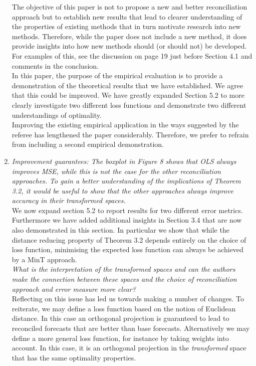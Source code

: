 \documentclass[a4paper,11pt]{article}
\begin{document}
\begin{enumerate}
		The objective of this paper is not to propose a new and better reconciliation approach but to establish new results that lead to clearer understanding of the properties of existing methods that in turn motivate research into new methods.  Therefore, while the paper does not include a new method, it does provide insights into how new methods should (or should not) be developed.  For examples of this, see the discussion on page 19 just before Section 4.1 and comments in the conclusion.\\
		
		In this paper, the purpose of the empirical evaluation is to provide a demonstration of the theoretical results that we have established.  We agree that this could be improved.  We have greatly expanded Section 5.2 to more clearly investigate two different loss functions and demonstrate two different understandings of optimality.\\
		
		Improving the existing empirical application in the ways suggested by the referee has lengthened the paper considerably.  Therefore, we prefer to refrain from including a second empirical demonstration.\\
		
		\item \textit{Improvement guarantees: The boxplot in Figure 8 shows that OLS always improves MSE, while this is not the case for the other reconciliation approaches. To gain a better understanding of the implications of Theorem 3.2, it would be useful to show that the other approaches always
		improve accuracy in their transformed spaces.}\\
	
	    We now expand section 5.2 to report results for two different error metrics.  Furthermore we have added additional insights in Section 3.4 that are now also demonstrated in this section.  In particular we show that while the distance reducing property of Theorem 3.2 depends entirely on the choice of loss function, minimising the expected loss function can always be achieved by a MinT approach.\\ 
		
		\textit{What is the interpretation of the transformed spaces and can the authors make the connection	between these spaces and the choice of reconciliation approach and error measure more clear?}\\ 
	
	    
	    Reflecting on this issue has led us towards making a number of changes.  To reiterate, we may define a loss function based on the notion of Euclidean distance.  In this case an orthogonal projection is guaranteed to lead to reconciled forecasts that are better than base forecasts.  Alternatively we may define a more general loss function, for instance by taking weights into account.  In this case, it is an orthogonal projection in the \textit{transformed} space that has the same optimality properties.\\
	    

\end{enumerate}
\end{document}
